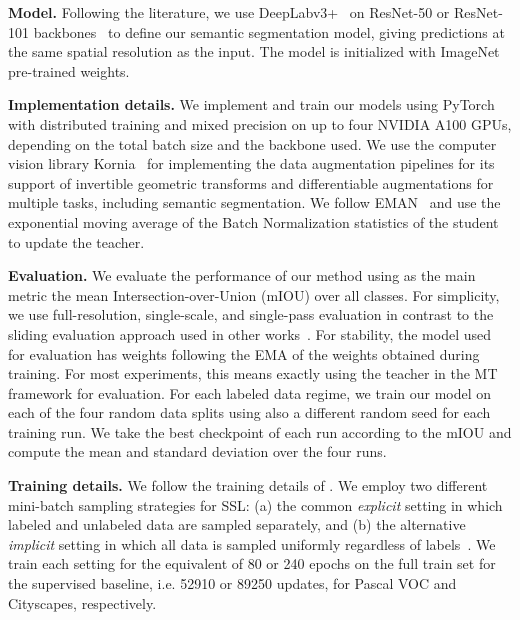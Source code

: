 \noindent \textbf{Model.} Following the literature, we use DeepLabv3+~\cite{deeplabv3} on ResNet-50 or ResNet-101 backbones~\cite{resnet} to define our semantic segmentation model, giving predictions at the same spatial resolution as the input. The model is initialized with ImageNet~\cite{imagenet} pre-trained weights.

\noindent \textbf{Implementation details.} We implement and train our models using PyTorch~\cite{pytorch} with distributed training and mixed precision on up to four NVIDIA A100 GPUs, depending on the total batch size and the backbone used. We use the computer vision library Kornia~\cite{kornia} for implementing the data augmentation pipelines for its support of invertible geometric transforms and differentiable augmentations for multiple tasks, including semantic segmentation. We follow EMAN~\cite{eman} and use the exponential moving average of the Batch Normalization statistics of the student to update the teacher.


\noindent \textbf{Evaluation.} We evaluate the performance of our method using as the main metric the mean Intersection-over-Union (mIOU) over all classes. For simplicity, we use full-resolution, single-scale, and single-pass evaluation in contrast to the sliding evaluation approach used in other works~\cite{cps,ael,u2pl}. For stability, the model used for evaluation has weights following the EMA of the weights obtained during training. For most experiments, this means exactly using the teacher in the MT framework for evaluation. For each labeled data regime, we train our model on each of the four random data splits using also a different random seed for each training run. We take the best checkpoint of each run according to the mIOU and compute the mean and standard deviation over the four runs.

\noindent \textbf{Training details.} We follow the training details of \cite{u2pl}. We employ two different mini-batch sampling strategies for SSL: (a) the common \textit{explicit} setting in which labeled and unlabeled data are sampled separately, and (b) the alternative \textit{implicit} setting in which all data is sampled uniformly regardless of labels~\cite{analysis_fixmatch}.
We train each setting for the equivalent of 80 or 240 epochs on the full train set for the supervised baseline, i.e. 52910 or 89250 updates, for Pascal VOC and Cityscapes, respectively.

